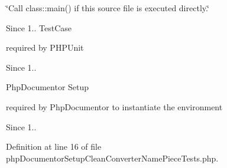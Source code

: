\char`\"{}\-Call class\-::main() if this source file is executed directly.\char`\"{} \begin{DoxySince}{\-Since}
1.. \-Test\-Case
\end{DoxySince}
required by \-P\-H\-P\-Unit \begin{DoxySince}{\-Since}
1..
\end{DoxySince}
\-Php\-Documentor \-Setup

required by \-Php\-Documentor to instantiate the environment \begin{DoxySince}{\-Since}
1.. 
\end{DoxySince}


\-Definition at line 16 of file php\-Documentor\-Setup\-Clean\-Converter\-Name\-Piece\-Tests.\-php.

